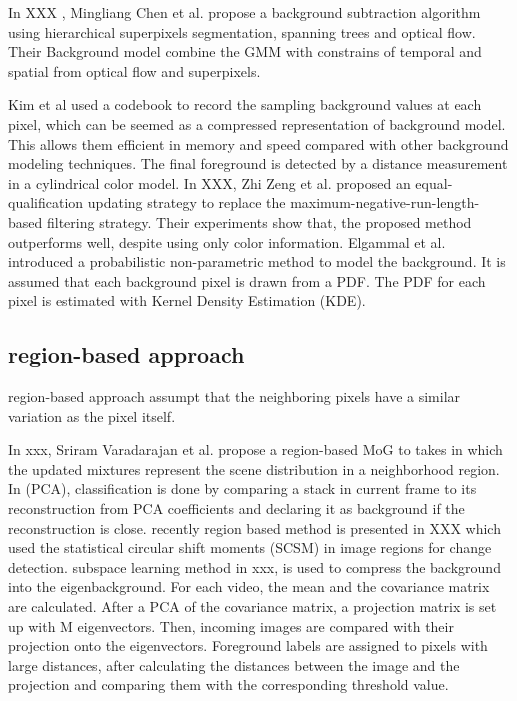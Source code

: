 \documentclass[journal]{IEEEtran}
\begin{document}
In XXX , Mingliang Chen et al. 
propose a background subtraction algorithm using hierarchical superpixels segmentation, spanning trees and optical flow. 
Their Background model combine the GMM with constrains of temporal and spatial from optical flow and superpixels. 

Kim et al used a codebook to record the sampling background values at each pixel, which can be seemed as a compressed representation of background model. 
This allows them efficient in memory and speed compared with other background modeling techniques. 
The final foreground is detected by a distance measurement in a cylindrical color model.
In XXX, Zhi Zeng et al. 
proposed an equal-qualification updating strategy to replace the maximum-negative-run-length-based filtering strategy. 
Their experiments show that, the proposed method outperforms well, despite using only color information.
Elgammal et al. 
introduced a probabilistic non-parametric method to model the background. 
It is assumed that each background pixel is drawn from a PDF. 
The PDF for each pixel is estimated with Kernel Density Estimation (KDE).
\subsection{region-based approach}
region-based approach assumpt that the neighboring pixels have a similar variation as the pixel itself. 

In xxx, Sriram Varadarajan et al. 
propose a region-based MoG to takes in which the updated mixtures represent the scene distribution in a neighborhood region.
In (PCA), classification is done by comparing a stack in current frame to its reconstruction from PCA coefficients and declaring it as background if the reconstruction is close.
recently region based method is presented in XXX which used the statistical circular shift moments (SCSM) in image regions for change detection.
subspace learning method in xxx, is used to compress the background into the eigenbackground. 
For each video, the mean and the covariance matrix are calculated. 
After a PCA of the covariance matrix, a projection matrix is set up with M eigenvectors. 
Then, incoming images are compared with their projection onto the eigenvectors. 
Foreground labels are assigned to pixels with large distances, after calculating the distances between the image and the projection and comparing them with the corresponding threshold value. 
\end{document}
